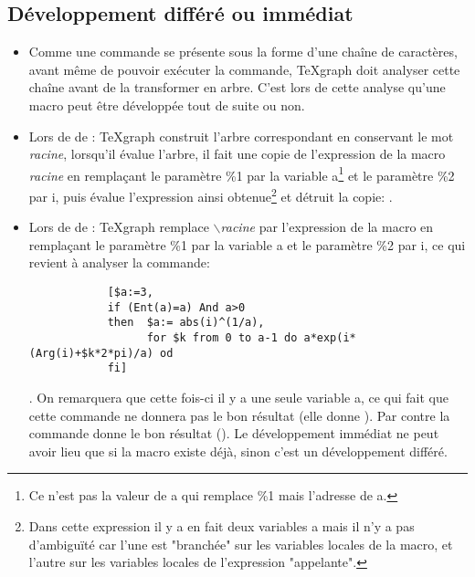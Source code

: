 \subsection{Développement différé ou immédiat}

\begin{itemize}
\item Comme une commande se présente sous la forme d'une chaîne de caractères, avant même de pouvoir exécuter la commande, TeXgraph doit analyser cette chaîne avant de la transformer en arbre. C'est lors de cette analyse qu'une macro peut être développée tout de suite ou non.

\item Lors de  de \co{[\$a:=3, racine(a,i)]}: TeXgraph construit l'arbre correspondant en conservant le mot \textsl{racine}, lorsqu'il évalue l'arbre, il fait une copie de l'expression de la macro \textsl{racine} en remplaçant le paramètre \%1 par la variable a\footnote{Ce n'est pas la valeur de a qui remplace \%1 mais l'adresse de a.} et le paramètre \%2 par i, puis évalue l'expression ainsi obtenue\footnote{Dans cette expression il y a en fait deux variables a mais il n'y a pas d'ambiguïté car l'une est "branchée" sur les variables locales de la macro, et l'autre sur les variables locales de l'expression "appelante".} et détruit la copie: .

\item Lors de  de \co{[\$a:=3, $\backslash$racine(a,i)]}: TeXgraph remplace \textsl{$\backslash$racine} par l'expression de la macro en remplaçant le paramètre \%1 par la variable a et le paramètre \%2 par i, ce qui revient à analyser la commande: 

\begin{verbatim}
            [$a:=3,
            if (Ent(a)=a) And a>0
            then  $a:= abs(i)^(1/a), 
                  for $k from 0 to a-1 do a*exp(i*(Arg(i)+$k*2*pi)/a) od
            fi]
\end{verbatim}

. On remarquera que cette fois-ci il y a une seule variable a, ce qui fait que cette commande ne donnera pas le bon résultat (elle donne ). Par contre la commande \co{[\$b:=3, $\backslash$racine(b,i)]} donne le bon résultat (\res{[0.866025403784+0.5*i,-0.866025403784+0.5*i,-i]}). Le développement immédiat ne peut avoir lieu que si la macro existe déjà, sinon c'est un développement différé.


\end{itemize}
